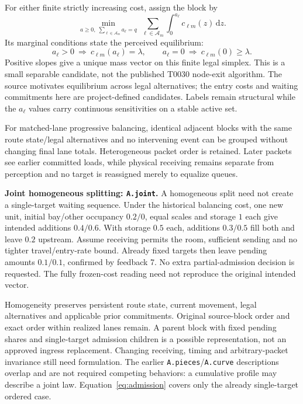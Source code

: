 \documentclass[11pt]{article}
\newcommand{\dd}{\mathrm d}
\begin{document}
For either finite strictly increasing cost, assign the block by
\begin{equation}
 \min_{a\ge0,\;\sum_{\ell\in\mathcal A_m}a_\ell=q}
 \ \sum_{\ell\in\mathcal A_m}\int_0^{a_\ell}c_{\ell m}(z)\,\dd z.
 \label{eq:allocation}
\end{equation}
Its marginal conditions state the perceived equilibrium:
\begin{equation}
 a_\ell>0\ \Longrightarrow\ c_{\ell m}(a_\ell)=\lambda,\qquad
 a_\ell=0\ \Longrightarrow\ c_{\ell m}(0)\ge\lambda.
\end{equation}
Positive slopes give a unique mass vector on this finite legal simplex. This is a small separable candidate, not the published T0030 node-exit algorithm. The source motivates equilibrium across legal alternatives; the entry costs and waiting commitments here are project-defined candidates. Labels remain structural while the $a_\ell$ values carry continuous sensitivities on a stable active set.

For matched-lane progressive balancing, identical adjacent blocks with the same route state/legal alternatives and no intervening event can be grouped without changing final lane totals. Heterogeneous packet order is retained. Later packets see earlier committed loads, while physical receiving remains separate from perception and no target is reassigned merely to equalize queues.

\textbf{Joint homogeneous splitting: \texttt{A.joint}.} A homogeneous split need not create a single-target waiting sequence. Under the historical balancing cost, one new unit, initial bay/other occupancy $0.2/0$, equal scales and storage $1$ each give intended additions $0.4/0.6$. With storage $0.5$ each, additions $0.3/0.5$ fill both and leave $0.2$ upstream. Assume receiving permits the room, sufficient sending and no tighter travel/entry-rate bound. Already fixed targets then leave pending amounts $0.1/0.1$, confirmed by feedback 7. No extra partial-admission decision is requested. The fully frozen-cost reading need not reproduce the original intended vector.

Homogeneity preserves persistent route state, current movement, legal alternatives and applicable prior commitments. Original source-block order and exact order within realized lanes remain. A parent block with fixed pending shares and single-target admission children is a possible representation, not an approved ingress replacement. Changing receiving, timing and arbitrary-packet invariance still need formulation. The earlier \texttt{A.pieces}/\texttt{A.curve} descriptions overlap and are not required competing behaviors: a cumulative profile may describe a joint law. Equation~\eqref{eq:admission} covers only the already single-target ordered case.
\end{document}
